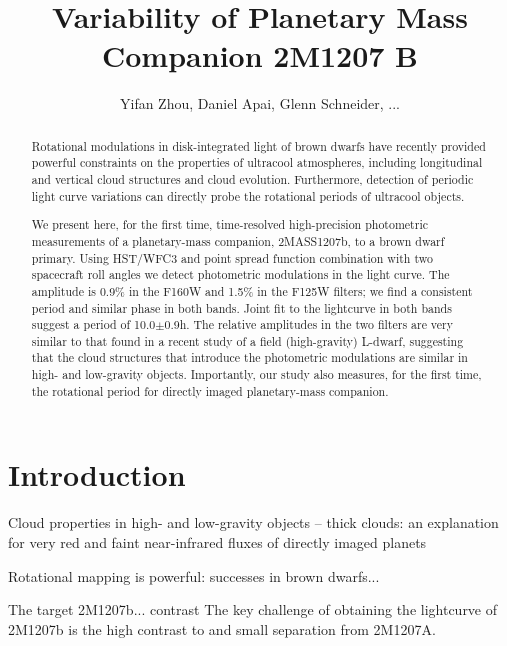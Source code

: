 \documentclass[apj]{emulateapj}
\begin{document}
\title{Variability of Planetary Mass Companion 2M1207 B}
\author{Yifan Zhou, Daniel Apai, Glenn Schneider, ...}

\begin{abstract} Rotational modulations in disk-integrated light of
brown dwarfs have recently provided powerful constraints on the
properties of ultracool atmospheres, including longitudinal and
vertical cloud structures and cloud evolution. Furthermore, detection
of periodic light curve variations can directly probe the rotational
periods of ultracool objects.

We present here, for the first time, time-resolved high-precision
photometric measurements of a planetary-mass companion, 2MASS1207b, to
a brown dwarf primary. Using HST/WFC3 and point spread function %
combination with two spacecraft roll angles we detect photometric
modulations in the light curve. The amplitude is 0.9\% in the F160W
and 1.5\% in the F125W filters; we find a consistent period and
similar phase in both bands. Joint fit to the lightcurve in both bands
suggest a period of 10.0$\pm$0.9h. The relative amplitudes in the two
filters are very similar to that found in a recent study of a field
(high-gravity) L-dwarf, suggesting that the cloud structures that
introduce the photometric modulations are similar in high- and
low-gravity objects. Importantly, our study also measures, for the
first time, the rotational period for directly imaged planetary-mass
companion.
\end{abstract}

\maketitle
%
\section{Introduction}

Cloud properties in high- and low-gravity objects -- thick clouds: an
explanation for very red and faint near-infrared fluxes of directly
imaged planets

Rotational mapping is powerful: successes in brown dwarfs...

The target 2M1207b... contrast The key challenge of obtaining the
lightcurve of 2M1207b is the high contrast to and small separation
from 2M1207A.
\end{document}
